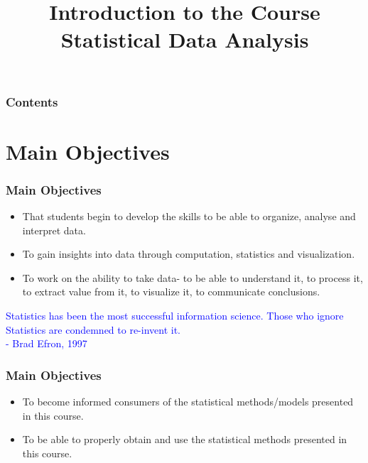 \documentclass{beamer}
\title[Short title]{Introduction to the Course Statistical Data Analysis} %
\author{} %
\institute[] %
{
 \\ %
\medskip
\textit{} %
}
\date{} %
\begin{document}
\decimalpoint
\begin{frame}
\titlepage %
\end{frame}

\begin{frame}
\frametitle{Contents} %
\tableofcontents %
\end{frame}

\section{Main Objectives}
\begin{frame}
\frametitle{Main Objectives}
\begin{itemize}
\item That students begin to develop the skills to be able to organize, 
analyse and interpret data.  
\item To gain insights into data through computation, statistics and 
visualization. 
\item To work on the ability to take data- to be able to understand it, 
to process it, to extract value from it, to visualize it, to communicate conclusions.\\[15pt]
\end{itemize}
\begin{displayquote}
\textcolor{blue}{Statistics has been the most successful information science. Those who ignore
Statistics are condemned to re-invent it. \\ - Brad Efron, 1997}
\end{displayquote}
\end{frame}
\begin{frame}
\frametitle{Main Objectives}
\begin{itemize}
\item To become informed consumers of the statistical methods/models 
presented in this course. \\[30pt]

\item To be able to properly obtain and use the statistical methods presented 
in this course.
\end{itemize}

\end{frame}
\end{document}
